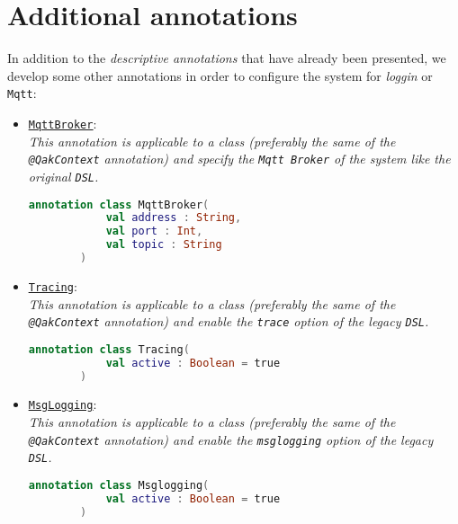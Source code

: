 \section{Additional annotations}

In addition to the \textit{descriptive annotations} that have already been presented, we develop some other annotations in order to configure the system for \textit{loggin} or \texttt{Mqtt}:

\begin{itemize}
	\item \href{https://github.com/LM-96/QA-Extensions/blob/main/it.unibo.qakactor/src/main/kotlin/annotations/MqttBroker.kt}{\textcolor{YellowOrange}{\underline{\texttt{MqttBroker}}}}:\\
	\textit{This annotation is applicable to a class (preferably the same of the \texttt{@QakContext} annotation) and specify the \texttt{Mqtt Broker} of the system like the original \texttt{DSL}.}
	\begin{lstlisting}[numbers=none,language=Kotlin]
		annotation class MqttBroker(
			val address : String,
			val port : Int,
			val topic : String
		)
	\end{lstlisting}
	
	\item \href{https://github.com/LM-96/QA-Extensions/blob/main/it.unibo.qakactor/src/main/kotlin/annotations/Tracing.kt}{\textcolor{YellowOrange}{\underline{\texttt{Tracing}}}}:\\
	\textit{This annotation is applicable to a class (preferably the same of the \texttt{@QakContext} annotation) and enable the \texttt{trace} option of the legacy \texttt{DSL}.}
	\begin{lstlisting}[numbers=none,language=Kotlin]
		annotation class Tracing(
			val active : Boolean = true
		)
	\end{lstlisting}

	\item \href{https://github.com/LM-96/QA-Extensions/blob/main/it.unibo.qakactor/src/main/kotlin/annotations/Msglogging.kt}{\textcolor{YellowOrange}{\underline{\texttt{MsgLogging}}}}:\\
	\textit{This annotation is applicable to a class (preferably the same of the \texttt{@QakContext} annotation) and enable the \texttt{msglogging} option of the legacy \texttt{DSL}.}
	\begin{lstlisting}[numbers=none,language=Kotlin]
		annotation class Msglogging(
			val active : Boolean = true
		)
	\end{lstlisting}
	

\end{itemize}
